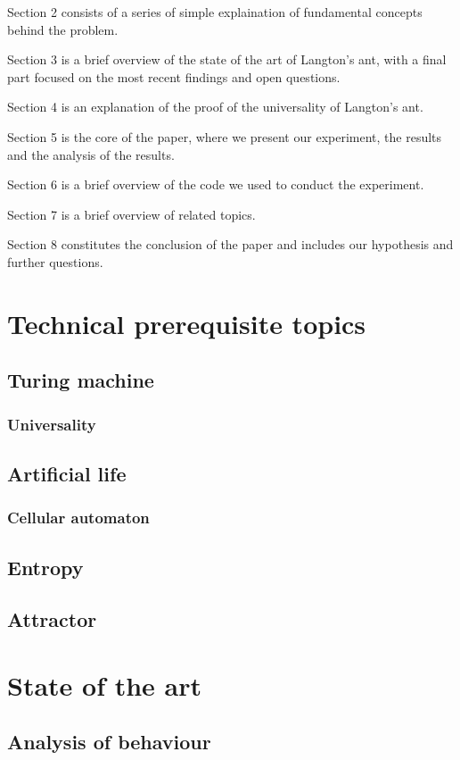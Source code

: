 \documentclass{article}
\begin{document}
Section 2 consists of a series of simple explaination of fundamental concepts behind the problem.

Section 3 is a brief overview of the state of the art of Langton's ant, with a final part focused on the most recent findings and open questions.

Section 4 is an explanation of the proof of the universality of Langton's ant.

Section 5 is the core of the paper, where we present our experiment, the results and the analysis of the results.

Section 6 is a brief overview of the code we used to conduct the experiment.

Section 7 is a brief overview of related topics.

Section 8 constitutes the conclusion of the paper and includes our hypothesis and further questions.

\section{Technical prerequisite topics}
\subsection{Turing machine}
\subsubsection{Universality}
\subsection{Artificial life}
\subsubsection{Cellular automaton}
\subsection{Entropy}
\subsection{Attractor}

\section{State of the art}
\subsection{Analysis of behaviour}
\end{document}

